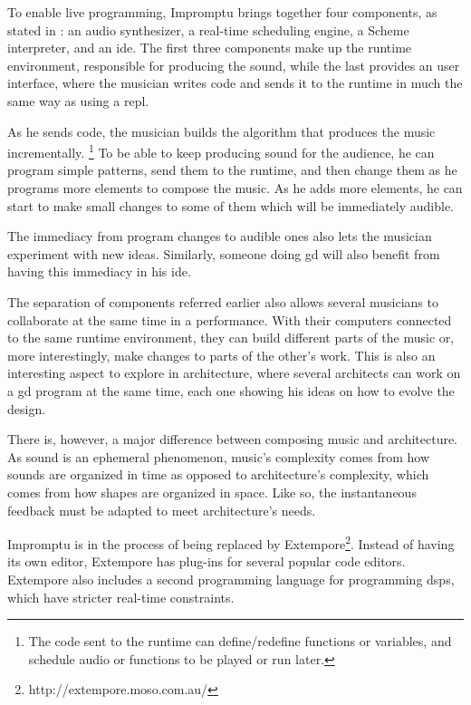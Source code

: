 To enable live programming, Impromptu brings together four components, as stated in \cite{sorensen2005impromptu}: an audio synthesizer, a real-time scheduling engine, a Scheme interpreter, and an \gls{ide}.
The first three components make up the runtime environment, responsible for producing the sound, while the last provides an user interface, where the musician writes code and sends it to the runtime in much the same way as using a \gls{repl}.

As he sends code, the musician builds the algorithm that produces the music incrementally.%
\footnote{The code sent to the runtime can define/redefine functions or variables, and schedule audio or functions to be played or run later.}
To be able to keep producing sound for the audience, he can program simple patterns, send them to the runtime, and then change them as he programs more elements to compose the music.
As he adds more elements, he can start to make small changes to some of them which will be immediately audible.

The immediacy from program changes to audible ones also lets the musician experiment with new ideas.
Similarly, someone doing \gls{gd} will also benefit from having this immediacy in his \gls{ide}.

The separation of components referred earlier also allows several musicians to collaborate at the same time in a performance\cite{sorensen2005impromptu}.
With their computers connected to the same runtime environment, they can build different parts of the music or, more interestingly, make changes to parts of the other's work.
This is also an interesting aspect to explore in architecture, where several architects can work on a \gls{gd} program at the same time, each one showing his ideas on how to evolve the design.

There is, however, a major difference between composing music and architecture.
As sound is an ephemeral phenomenon, music's complexity comes from how sounds are organized in time as opposed to architecture's complexity, which comes from how shapes are organized in space.
Like so, the instantaneous feedback must be adapted to meet architecture's needs.

Impromptu is in the process of being replaced by Extempore\footnote{http://extempore.moso.com.au/}.
Instead of having its own editor, Extempore has plug-ins for several popular code editors.
Extempore also includes a second programming language for programming \glspl{dsp}, which have stricter real-time constraints.



